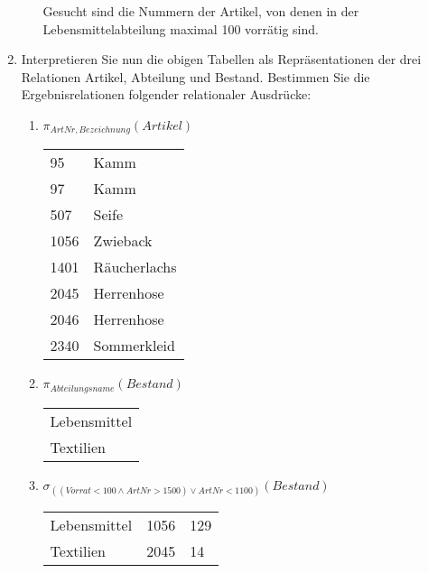\documentclass{lehramt-informatik-aufgabe}
\begin{document}
\begin{enumerate}
\begin{enumerate}
\begin{antwort}[muster]
Gesucht sind die Nummern der Artikel, von denen in der
Lebensmittelabteilung maximal 100 vorrätig sind.
\end{antwort}

\end{enumerate}

\item Interpretieren Sie nun die obigen Tabellen als Repräsentationen
der drei Relationen Artikel, Abteilung und Bestand. Bestimmen Sie die
Ergebnisrelationen folgender relationaler Ausdrücke:

\begin{enumerate}


\item $\pi_{ArtNr,Bezeichnung}(Artikel)$

\begin{antwort}[muster]
\begin{tabular}{ll}
95    & Kamm          \\
97    & Kamm          \\
507   & Seife         \\
1056  & Zwieback      \\
1401  & Räucherlachs  \\
2045  & Herrenhose    \\
2046  & Herrenhose    \\
2340  & Sommerkleid
\end{tabular}
\end{antwort}


\item $\pi_{Abteilungsname}(Bestand)$

\begin{antwort}[muster]
\begin{tabular}{l}
Lebensmittel   \\
Textilien
\end{tabular}
\end{antwort}


\item $\sigma_{((Vorrat < 100 \land ArtNr > 1500) \lor ArtNr < 1100)}(Bestand)$

\begin{antwort}[muster]
\begin{tabular}{lll}
Lebensmittel    & 1056  & 129    \\
Textilien       & 2045  & 14
\end{tabular}
\end{antwort}


\end{enumerate}
\end{enumerate}
\end{document}
